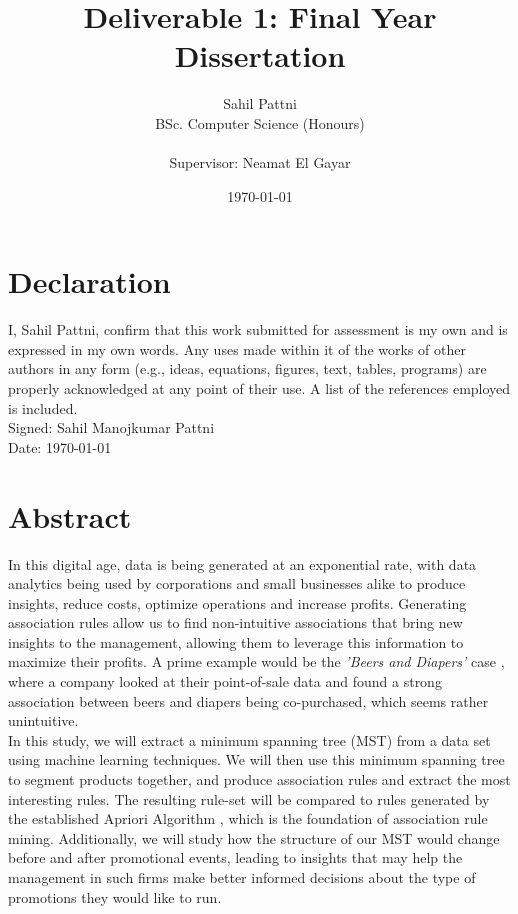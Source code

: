 \documentclass[a4paper,11pt]{article}
\begin{document}
\title{Deliverable 1: Final Year Dissertation}
\author{
	Sahil Pattni\\ 
	BSc. Computer Science (Honours)\\\\
	Supervisor: Neamat El Gayar
	}
\date{\today}
\maketitle
{}
\newpage
\section*{Declaration}
I, Sahil Pattni, confirm that this work submitted for assessment is my own and is expressed in my own words. Any uses made within it of the works of other authors in any form (e.g., ideas, equations, figures, text, tables, programs) are properly acknowledged at any point of their use. A list of the references employed is included. 
\\
Signed: Sahil Manojkumar Pattni\\
Date: \today


\section*{Abstract}
In this digital age, data is being generated at an exponential rate, with data analytics being used by corporations and small businesses alike to produce insights, reduce costs, optimize operations and increase profits.  Generating association rules allow us to find non-intuitive associations that bring new insights to the management, allowing them to leverage this information to maximize their profits. A prime example would be the \textit{'Beers and Diapers'} case \cite{beers_diapers}, where a company looked at their point-of-sale data and found a strong association between beers and diapers being co-purchased, which seems rather unintuitive.
\\In this study, we will extract a minimum spanning tree (MST) from a data set using machine learning techniques. We will then use this minimum spanning tree to segment products together,  and produce association rules and extract the most interesting rules. The resulting rule-set will be compared to rules generated by the established Apriori Algorithm \cite{apriori}, which is the foundation of association rule mining.  Additionally, we will study how the structure of our MST would change before and after promotional events, leading to insights that may help the management in such firms make better informed decisions about the type of promotions they would like to run.
\end{document}
